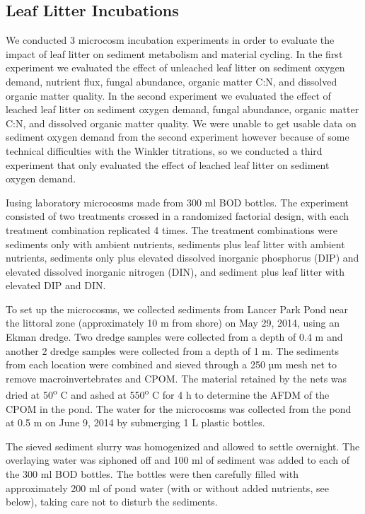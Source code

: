 \subsection{Leaf Litter Incubations}
We conducted 3 microcosm incubation experiments in order to evaluate the impact of leaf litter on sediment metabolism and material cycling. In the first experiment we evaluated the effect of unleached leaf litter on sediment oxygen demand, nutrient flux, fungal abundance, organic matter C:N, and dissolved organic matter quality. In the second experiment we evaluated the effect of leached leaf litter on sediment oxygen demand, fungal abundance, organic matter C:N, and dissolved organic matter quality. We were unable to get usable data on sediment oxygen demand from the second experiment however because of some technical difficulties with the Winkler titrations, so we conducted a third experiment that only evaluated the effect of leached leaf litter on sediment oxygen demand.

Iusing laboratory microcosms made from 300 ml BOD bottles. The experiment consisted of two treatments crossed in a randomized factorial design, with each treatment combination replicated 4 times. The treatment combinations were sediments only with ambient nutrients, sediments plus leaf litter with ambient nutrients, sediments only plus elevated dissolved inorganic phosphorus (DIP) and elevated dissolved inorganic nitrogen (DIN), and sediment plus leaf litter with elevated DIP and DIN. 

To set up the microcosms, we collected sediments from Lancer Park Pond near the littoral zone (approximately 10 m from shore) on May 29, 2014, using an Ekman dredge.  Two dredge samples were collected from a depth of 0.4 m and another 2 dredge samples were collected from a depth of 1 m. The sediments from each location were combined and sieved through a 250 µm mesh net to remove macroinvertebrates and CPOM. The material retained by the nets was dried at 50\textsuperscript{o} C and ashed at 550\textsuperscript{o} C for 4 h to determine the AFDM of the CPOM in the pond. The water for the microcosms was  collected from the pond at 0.5 m on June 9, 2014 by submerging 1 L plastic bottles.

The sieved sediment slurry was homogenized and allowed to settle overnight. The overlaying water was siphoned off and 100 ml of sediment was added to each of the 300 ml BOD bottles. The bottles were then carefully filled with approximately 200 ml of pond water (with or without added nutrients, see below), taking care not to disturb the sediments. 

